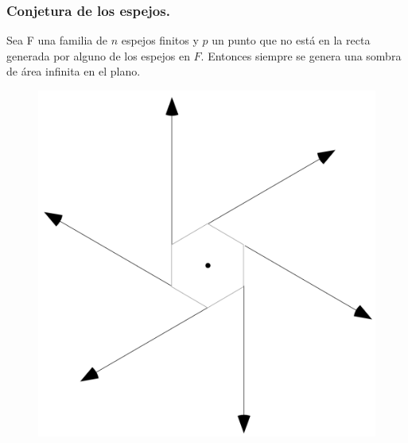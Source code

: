 \begin{frame}
  \frametitle{Conjetura de los espejos.}
  \begin{conjetura}
    Sea F una familia de $n$ espejos finitos y $p$ un punto que no
    está en la recta generada por alguno de los espejos en $F$. Entonces siempre
    se genera una sombra de área infinita en el plano.
  \end{conjetura}
  \begin{figure}
    \centering
    \includegraphics[width=.25 \paperwidth]{./images/EspejosInfinitos.png}
  \end{figure}
\end{frame}
